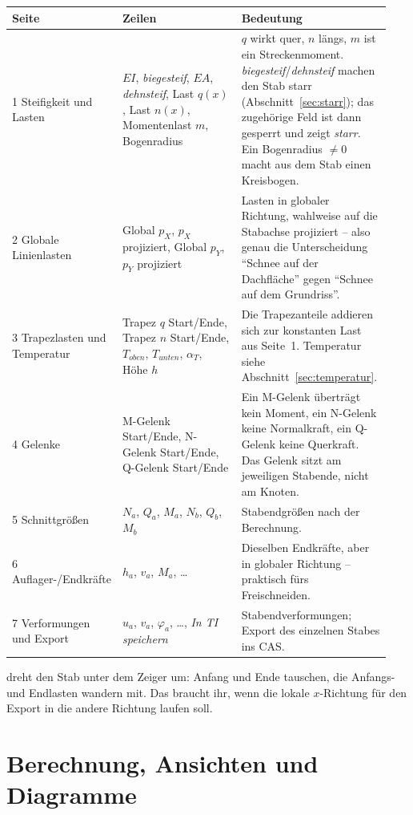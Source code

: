 \begin{longtable}{p{0.16\linewidth}p{0.38\linewidth}p{0.40\linewidth}}
  \toprule
  \textbf{Seite} & \textbf{Zeilen} & \textbf{Bedeutung} \\
  \midrule \endhead
  1 Steifigkeit und Lasten & $EI$, \emph{biegesteif}, $EA$, \emph{dehnsteif}, Last $q(x)$,
    Last $n(x)$, Momentenlast $m$, Bogenradius &
    $q$ wirkt quer, $n$ längs, $m$ ist ein Streckenmoment. \emph{biegesteif}/\emph{dehnsteif}
    machen den Stab starr (Abschnitt~\ref{sec:starr}); das zugehörige Feld ist dann gesperrt und
    zeigt \emph{starr}. Ein Bogenradius $\ne 0$ macht aus dem Stab einen Kreisbogen. \\
  2 Globale Linienlasten & Global $p_X$, $p_X$ projiziert, Global $p_Y$, $p_Y$ projiziert &
    Lasten in globaler Richtung, wahlweise auf die Stabachse projiziert -- also genau die
    Unterscheidung \enquote{Schnee auf der Dachfläche} gegen \enquote{Schnee auf dem Grundriss}. \\
  3 Trapezlasten und Temperatur & Trapez $q$ Start/Ende, Trapez $n$ Start/Ende,
    $T_{oben}$, $T_{unten}$, $\alpha_T$, Höhe $h$ &
    Die Trapezanteile addieren sich zur konstanten Last aus Seite~1. Temperatur siehe
    Abschnitt~\ref{sec:temperatur}. \\
  4 Gelenke & M-Gelenk Start/Ende, N-Gelenk Start/Ende, Q-Gelenk Start/Ende &
    Ein M-Gelenk überträgt kein Moment, ein N-Gelenk keine Normalkraft, ein Q-Gelenk keine
    Querkraft. Das Gelenk sitzt am jeweiligen Stabende, nicht am Knoten. \\
  5 Schnittgrößen & $N_a$, $Q_a$, $M_a$, $N_b$, $Q_b$, $M_b$ & Stabendgrößen nach der Berechnung. \\
  6 Auflager-/Endkräfte & $h_a$, $v_a$, $M_a$, \dots & Dieselben Endkräfte, aber in globaler
    Richtung -- praktisch fürs Freischneiden. \\
  7 Verformungen und Export & $u_a$, $v_a$, $\varphi_a$, \dots, \emph{In TI speichern} &
    Stabendverformungen; Export des einzelnen Stabes ins CAS. \\
  \bottomrule
\end{longtable}

 dreht den Stab unter dem Zeiger um: Anfang und Ende tauschen, die Anfangs- und
Endlasten wandern mit. Das braucht ihr, wenn die lokale $x$-Richtung für den Export in die
andere Richtung laufen soll.


\section{Berechnung, Ansichten und Diagramme}

